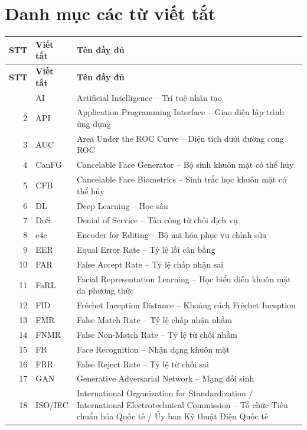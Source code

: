 \chapter*{Danh mục các từ viết tắt}

{\small
\begin{longtable}{r l >{\raggedright\arraybackslash}p{10.6cm}}
\toprule
\textbf{STT} & \textbf{Viết tắt} & \textbf{Tên đầy đủ} \\
\midrule
\endfirsthead
\toprule
\textbf{STT} & \textbf{Viết tắt} & \textbf{Tên đầy đủ} \\
\midrule
\endhead
\bottomrule
\endfoot
1 & AI & Artificial Intelligence -- Trí tuệ nhân tạo \\
2 & API & Application Programming Interface -- Giao diện lập trình ứng dụng \\
3 & AUC & Area Under the ROC Curve -- Diện tích dưới đường cong ROC \\
4 & CanFG & Cancelable Face Generator -- Bộ sinh khuôn mặt có thể hủy \\
5 & CFB & Cancelable Face Biometrics -- Sinh trắc học khuôn mặt có thể hủy \\
6 & DL & Deep Learning -- Học sâu \\
7 & DoS & Denial of Service -- Tấn công từ chối dịch vụ \\
8 & e4e & Encoder for Editing -- Bộ mã hóa phục vụ chỉnh sửa \\
9 & EER & Equal Error Rate -- Tỷ lệ lỗi cân bằng \\
10 & FAR & False Accept Rate -- Tỷ lệ chấp nhận sai \\
11 & FaRL & Facial Representation Learning -- Học biểu diễn khuôn mặt đa phương thức \\
12 & FID & Fréchet Inception Distance -- Khoảng cách Fréchet Inception \\
13 & FMR & False Match Rate -- Tỷ lệ chấp nhận nhầm \\
14 & FNMR & False Non-Match Rate -- Tỷ lệ từ chối nhầm \\
15 & FR & Face Recognition -- Nhận dạng khuôn mặt \\
16 & FRR & False Reject Rate -- Tỷ lệ từ chối sai \\
17 & GAN & Generative Adversarial Network -- Mạng đối sinh \\
18 & ISO/IEC & International Organization for Standardization / International Electrotechnical Commission -- Tổ chức Tiêu chuẩn hóa Quốc tế / Ủy ban Kỹ thuật Điện Quốc tế \\

\end{longtable}}
